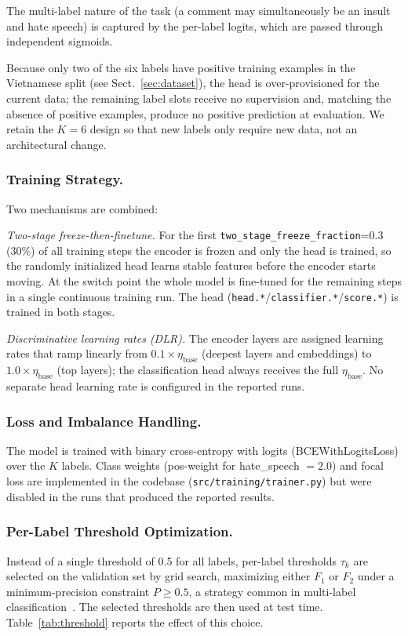 \documentclass[runningheads]{llncs}
\begin{document}
The multi-label nature of the task (a comment may simultaneously be an insult and hate speech) is captured by the per-label logits, which are passed through independent sigmoids.



Because only two of the six labels have positive training examples in the Vietnamese split (see Sect.~\ref{sec:dataset}), the head is over-provisioned for the current data; the remaining label slots receive no supervision and, matching the absence of positive examples, produce no positive prediction at evaluation. We retain the $K=6$ design so that new labels only require new data, not an architectural change.

\subsubsection{Training Strategy.}
Two mechanisms are combined:

\textit{Two-stage freeze-then-finetune.} For the first \texttt{two\_stage\_freeze\_fraction}=0.3 (30\%) of all training steps the encoder is frozen and only the head is trained, so the randomly initialized head learns stable features before the encoder starts moving. At the switch point the whole model is fine-tuned for the remaining steps in a single continuous training run. The head (\texttt{head.*}/\texttt{classifier.*}/\texttt{score.*}) is trained in both stages.

\textit{Discriminative learning rates (DLR).} The encoder layers are assigned learning rates that ramp linearly from $0.1 \times \eta_{\mathrm{base}}$ (deepest layers and embeddings) to $1.0 \times \eta_{\mathrm{base}}$ (top layers); the classification head always receives the full $\eta_{\mathrm{base}}$. No separate head learning rate is configured in the reported runs.

\subsubsection{Loss and Imbalance Handling.}
The model is trained with binary cross-entropy with logits (BCEWithLogitsLoss) over the $K$ labels. Class weights (pos-weight for hate\_speech $= 2.0$) and focal loss are implemented in the codebase (\texttt{src/training/trainer.py}) but were disabled in the runs that produced the reported results.

\subsubsection{Per-Label Threshold Optimization.}
Instead of a single threshold of 0.5 for all labels, per-label thresholds $\tau_k$ are selected on the validation set by grid search, maximizing either $F_1$ or $F_2$ under a minimum-precision constraint $P \ge 0.5$, a strategy common in multi-label classification~\cite{tsoumakas2007}. The selected thresholds are then used at test time. Table~\ref{tab:threshold} reports the effect of this choice.
\end{document}
